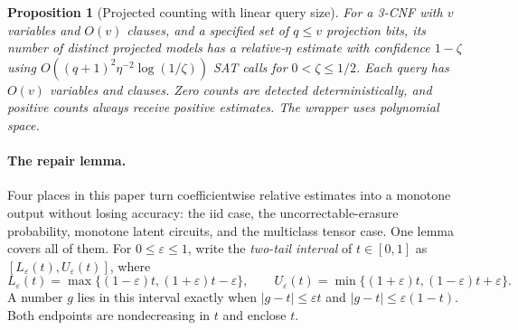 \documentclass[11pt]{article}
\newtheorem{proposition}[theorem]{Proposition}
\theoremstyle{remark}
\newcommand{\eps}{\varepsilon}
\begin{document}
\begin{proposition}[Projected counting with linear query size]
\label{prop:counter}
For a 3-CNF with \(v\) variables and \(O(v)\) clauses, and a specified
set of \(q\le v\) projection bits, its number of distinct projected
models has a relative-\(\eta\) estimate with confidence \(1-\zeta\)
using \(O((q+1)^2\eta^{-2}\log(1/\zeta))\) SAT calls for
\(0<\zeta\le1/2\). Each query has \(O(v)\) variables and clauses.
Zero counts are detected deterministically, and positive counts
always receive positive estimates. The wrapper uses polynomial space.
\end{proposition}

\paragraph{The repair lemma.}
Four places in this paper turn coefficientwise relative estimates into a
monotone output without losing accuracy: the iid case, the
uncorrectable-erasure probability, monotone latent circuits, and the
multiclass tensor case. One lemma covers all of them. For
\(0\le\eps\le1\), write the \emph{two-tail interval} of \(t\in[0,1]\) as
\([L_\eps(t),U_\eps(t)]\), where
\begin{equation}\label{eq:twotail}
 L_\eps(t)=\max\{(1-\eps)t,(1+\eps)t-\eps\},\qquad
 U_\eps(t)=\min\{(1+\eps)t,(1-\eps)t+\eps\}.
\end{equation}
A number \(g\) lies in this interval exactly when
\(|g-t|\le\eps t\) and \(|g-t|\le\eps(1-t)\). Both endpoints are
nondecreasing in \(t\) and enclose \(t\).
\end{document}
